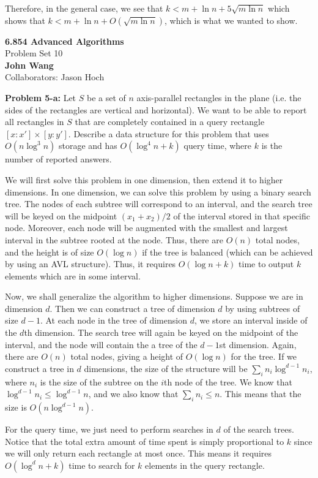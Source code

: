 \documentclass[psamsfonts]{amsart}
\newenvironment{sol}{\vspace{0.25cm}{\large \bfseries Solution:}}{\qedsymbol}
\newenvironment{prob}[1]{\begin{framed}{\large \bfseries Problem #1:}}{\end{framed}}
\newcommand{\makenewtitle}{
    \begin{center}
    {\huge \bfseries 6.854 Advanced Algorithms} \\
    Problem Set 10\\
    \vspace{0.25cm}
    {\bfseries John Wang} \\
    Collaborators: Jason Hoch 
    \end{center}
    \vspace{0.5cm}
}
\begin{document}
\begin{sol}
Therefore, in the general case, we see that $k < m + \ln n + 5 \sqrt{ m \ln n}$ which shows that $ k < m + \ln n + O(\sqrt{m \ln n})$, which is what we wanted to show.
\end{sol}

\newpage
\makenewtitle

\begin{prob}{5-a}
Let $S$ be a set of $n$ axis-parallel rectangles in the plane (i.e. the sides of the rectangles are vertical and horizontal). We want to be able to report all rectangles in $S$ that are completely contained in a query rectangle $[x: x'] \times [y : y']$. Describe a data structure for this problem that uses $O(n \log^3 n)$ storage and has $O(\log^4 n + k)$ query time, where $k$ is the number of reported answers.
\end{prob}
\begin{sol}
We will first solve this problem in one dimension, then extend it to higher dimensions. In one dimension, we can solve this problem by using a binary search tree. The nodes of each subtree will correspond to an interval, and the search tree will be keyed on the midpoint $(x_1 + x_2)/2$ of the interval stored in that specific node. Moreover, each node will be augmented with the smallest and largest interval in the subtree rooted at the node. Thus, there are $O(n)$ total nodes, and the height is of size $O(\log n)$ if the tree is balanced (which can be achieved by using an AVL structure). Thus, it requires $O(\log n + k)$ time to output $k$ elements which are in some interval. 

Now, we shall generalize the algorithm to higher dimensions. Suppose we are in dimension $d$. Then we can construct a tree of dimension $d$ by using subtrees of size $d-1$. At each node in the tree of dimension $d$, we store an interval inside of the $d$th dimension. The search tree will again be keyed on the midpoint of the interval, and the node will contain the a tree of the $d-1$st dimension. Again, there are $O(n)$ total nodes, giving a height of $O(\log n)$ for the tree. If we construct a tree in $d$ dimensions, the size of the structure will be $\sum_{i} n_i \log^{d-1} n_i$, where $n_i$ is the size of the subtree on the $i$th node of the tree. We know that $\log^{d-1} n_i \leq \log^{d-1} n$, and we also know that $\sum_{i} n_i \leq n$. This means that the size is $O(n \log^{d-1} n)$. 

For the query time, we just need to perform searches in $d$ of the search trees. Notice that the total extra amount of time spent is simply proportional to $k$ since we will only return each rectangle at most once. This means it requires $O(\log^d n + k)$ time to search for $k$ elements in the query rectangle. 


\end{sol}
\end{document}
